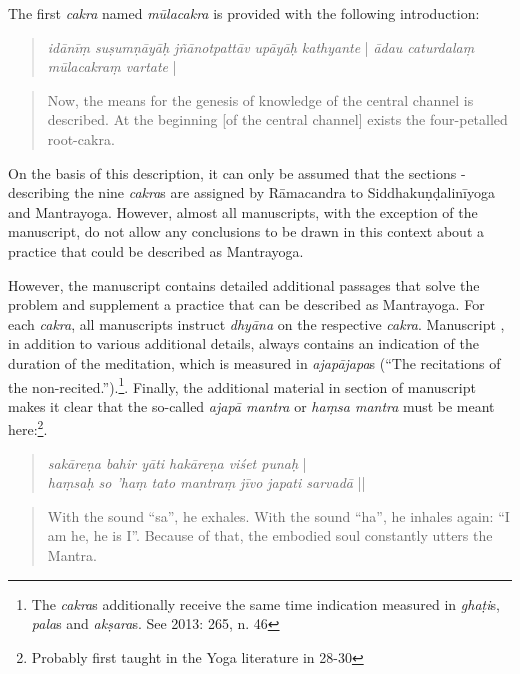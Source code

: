 The first \textit{cakra} named \textit{mūlacakra} is provided with the following introduction:

\begin{quote}
  \textit{idānīṃ suṣumṇāyāḥ jñānotpattāv upāyāḥ kathyante} | \textit{ādau caturdalaṃ mūlacakraṃ vartate} | 
\end{quote}
\begin{quote}
  Now, the means for the genesis of knowledge of the central channel is described. At the beginning [of the central channel] exists the four-petalled root-cakra.
  \end{quote}

  On the basis of this description, it can only be assumed that the sections - describing the nine \textit{cakra}s are assigned by Rāmacandra to Siddhakuṇḍalinīyoga and Mantrayoga. However, almost all manuscripts, with the exception of the  manuscript, do not allow any conclusions to be drawn in this context about a practice that could be described as Mantrayoga.

  However, the manuscript  contains detailed additional passages that solve the problem and supplement a practice that can be described as Mantrayoga. For each \textit{cakra}, all manuscripts instruct \textit{dhyāna} on the respective \textit{cakra}. Manuscript , in addition to various additional details, always contains an indication of the duration of the meditation, which is measured in \textit{ajapājapa}s (``The recitations of the non-recited.'').\footnote{The \textit{cakra}s additionally receive the same time indication measured in \textit{ghaṭi}s, \textit{pala}s and \textit{akṣara}s. See \citeauthor{birch2013} 2013: 265, n. 46}. Finally, the additional material in section  of manuscript  makes it clear that the so-called \textit{ajapā mantra} or \textit{haṃsa mantra} must be meant here:\footnote{Probably first taught in the Yoga literature in  28-30}.
    
  \begin{quote}
    \textit{sakāreṇa bahir yāti hakāreṇa viśet punaḥ} |\\  
    \textit{haṃsaḥ so 'haṃ tato mantraṃ jīvo japati sarvadā} ||
    \end{quote}
  \begin{quote}
With the sound ``sa'', he exhales. With the sound ``ha'', he inhales again: ``I am he, he is I''. Because of that, the embodied soul constantly utters the Mantra.
\end{quote}

